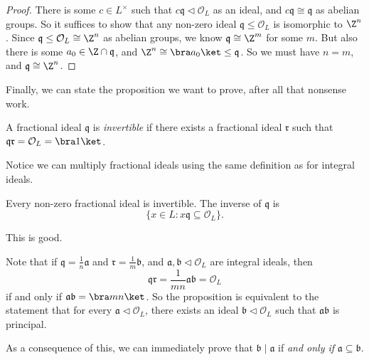 \documentclass[a4paper]{article}
\begin{document}
\begin{proof}
  There is some $c \in L^\times$ such that $c\mathfrak{q} \lhd \mathcal{O}_L$ as an ideal, and $c\mathfrak{q} \cong \mathfrak{q}$ as abelian groups. So it suffices to show that any non-zero ideal $\mathfrak{q} \leq \mathcal{O}_L$ is isomorphic to $\Z^n$. Since $\mathfrak{q} \leq \mathcal{O}_L \cong \Z^n$ as abelian groups, we know $\mathfrak{q} \cong \Z^m$ for some $m$. But also there is some $a_0 \in \Z \cap \mathfrak{q}$, and $\Z^n \cong \bra a_0\ket \leq \mathfrak{q}$. So we must have $n = m$, and $\mathfrak{q} \cong \Z^n$.
\end{proof}

Finally, we can state the proposition we want to prove, after all that nonsense work.

\begin{defi}
  A fractional ideal $\mathfrak{q}$ is \emph{invertible} if there exists a fractional ideal $\mathfrak{r}$ such that $\mathfrak{q}\mathfrak{r} = \mathcal{O}_L = \bra 1\ket$.
\end{defi}
Notice we can multiply fractional ideals using the same definition as for integral ideals.

\begin{prop}
  Every non-zero fractional ideal is invertible. The inverse of $\mathfrak{q}$ is
  \[
    \{x \in L: x\mathfrak{q} \subseteq \mathcal{O}_L\}.
  \]
\end{prop}
This is good.

Note that if $\mathfrak{q} = \frac{1}{n} \mathfrak{a}$ and $\mathfrak{r} = \frac{1}{m} \mathfrak{b}$, and $\mathfrak{a}, \mathfrak{b} \lhd \mathcal{O}_L$ are integral ideals, then
\[
  \mathfrak{q} \mathfrak{r} = \frac{1}{mn} \mathfrak{a}\mathfrak{b} = \mathcal{O}_L
\]
if and only if $\mathfrak{a}\mathfrak{b} = \bra mn\ket$. So the proposition is equivalent to the statement that for every $\mathfrak{a} \lhd \mathcal{O}_L$, there exists an ideal $\mathfrak{b} \lhd \mathcal{O}_L$ such that $\mathfrak{a}\mathfrak{b}$ is principal.

As a consequence of this, we can immediately prove that $\mathfrak{b} \mid \mathfrak{a}$ if \emph{and only if} $\mathfrak{a} \subseteq \mathfrak{b}$.
\end{document}
